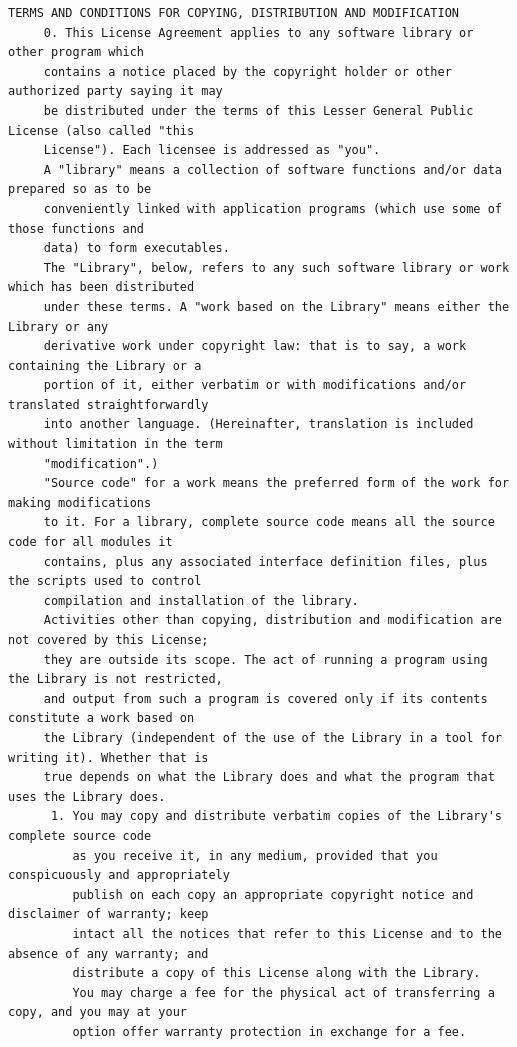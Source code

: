 \begin{lstlisting}[basicstyle=\ttfamily\footnotesize,breaklines=true]
     TERMS AND CONDITIONS FOR COPYING, DISTRIBUTION AND MODIFICATION
     0. This License Agreement applies to any software library or other program which
     contains a notice placed by the copyright holder or other authorized party saying it may
     be distributed under the terms of this Lesser General Public License (also called "this
     License"). Each licensee is addressed as "you".
     A "library" means a collection of software functions and/or data prepared so as to be
     conveniently linked with application programs (which use some of those functions and
     data) to form executables.
     The "Library", below, refers to any such software library or work which has been distributed
     under these terms. A "work based on the Library" means either the Library or any
     derivative work under copyright law: that is to say, a work containing the Library or a
     portion of it, either verbatim or with modifications and/or translated straightforwardly
     into another language. (Hereinafter, translation is included without limitation in the term
     "modification".)
     "Source code" for a work means the preferred form of the work for making modifications
     to it. For a library, complete source code means all the source code for all modules it
     contains, plus any associated interface definition files, plus the scripts used to control
     compilation and installation of the library.
     Activities other than copying, distribution and modification are not covered by this License;
     they are outside its scope. The act of running a program using the Library is not restricted,
     and output from such a program is covered only if its contents constitute a work based on
     the Library (independent of the use of the Library in a tool for writing it). Whether that is
     true depends on what the Library does and what the program that uses the Library does.
      1. You may copy and distribute verbatim copies of the Library's complete source code
         as you receive it, in any medium, provided that you conspicuously and appropriately
         publish on each copy an appropriate copyright notice and disclaimer of warranty; keep
         intact all the notices that refer to this License and to the absence of any warranty; and
         distribute a copy of this License along with the Library.
         You may charge a fee for the physical act of transferring a copy, and you may at your
         option offer warranty protection in exchange for a fee.





\end{lstlisting}
